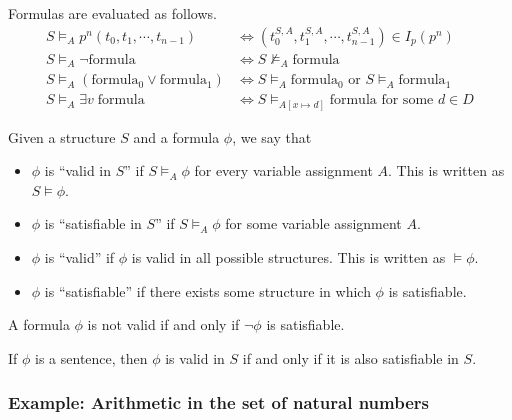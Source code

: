 Formulas are evaluated as follows.
%
\begin{align*}
    S \models_A p^n (t_0, t_1, \cdots, t_{n-1}) &\iff (t_0^{S, A}, t_1^{S, A}, \cdots, t_{n-1}^{S, A}) \in I_p (p^n)\\
    S \models_A \neg \text{formula} &\iff S \not\models_A \text{formula}\\
    S \models_A (\text{formula}_0 \lor \text{formula}_1) &\iff S \models_A \text{formula}_0 \text{ or } S \models_A \text{formula}_1\\
    S \models_A \exists v\; \text{formula} &\iff S \models_{A[x \mapsto d]} \text{formula for some } d \in D
\end{align*}

Given a structure \(S\) and a formula \(\phi\), we say that
%
\begin{itemize}
    \item \(\phi\) is ``valid in \(S\)'' if \(S \models_A \phi\) for every variable assignment \(A\). This is written as \(S \models \phi\).
    \item \(\phi\) is ``satisfiable in \(S\)'' if \(S \models_A \phi\) for some variable assignment \(A\).
    \item \(\phi\) is ``valid'' if \(\phi\) is valid in all possible structures. This is written as \(\models \phi\).
    \item \(\phi\) is ``satisfiable'' if there exists some structure in which \(\phi\) is satisfiable.
\end{itemize}
%
A formula \(\phi\) is not valid if and only if \(\neg \phi\) is satisfiable.

If \(\phi\) is a sentence, then \(\phi\) is valid in \(S\) if and only if it is also satisfiable in \(S\).



\subsubsection{Example: Arithmetic in the set of natural numbers}

